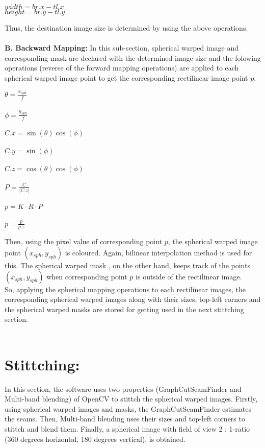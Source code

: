 \documentclass{article}
\begin{document}
\begin{center}				
				$width = br.x - tl.x$ \\ 
				$height = br.y - tl.y$
\end{center}
Thus, the destination image size is determined by using the above operations. \\~\\
\textbf{B. Backward Mapping:}
In this sub-section, spherical warped image and corresponding mask are declared with the determined image size and the folowing operations (reverse of the forward mapping operations) are applied to each spherical warped image point to get the corresponding rectilinear image point $p$.
\begin{center}
$\theta = \frac{x_{sph}}{f}$\\~\\
$\phi = \frac{y_{sph}}{f}$\\~\\
$C.x = \sin(\theta)\cos(\phi)$\\~\\
$C.y = \sin(\phi)$\\~\\
$C.z = \cos(\theta)\cos(\phi)$\\~\\
$P = \frac{C}{|C.z|}$\\~\\
$p = K \cdot R \cdot P$\\~\\
$p = \frac{p}{p.z}$
\end{center}
Then, using the pixel value of corresponding point $p$, the spherical warped image point  $(x_{sph}, y_{sph})$ is coloured. Again, bilinear interpolation method is used for this. The spherical warped mask , on the other hand, keeps track of the points $(x_{sph}, y_{sph})$ when corresponding point $p$ is outside of the rectilinear image.\\
So, applying the spherical mapping operations to each rectilinear images, the corresponding spherical warped images along with their sizes, top-left corners and the spherical warped masks are stored for getting used in the next stittching section.\\~\\
\section*{Stittching:}
In this section, the software uses two properties (GraphCutSeamFinder and Multi-band blending) of OpenCV to stittch the spherical warped images. Firstly, using spherical warped images and masks, the
GraphCutSeamFinder estimates the seams. Then, Multi-band blending uses their sizes and top-left corners to stittch and blend them. Finally, a spherical image with field of view 2 : 1-ratio (360 degrees horizontal, 180 degrees vertical), is obtained. \\~\\
\end{document}
